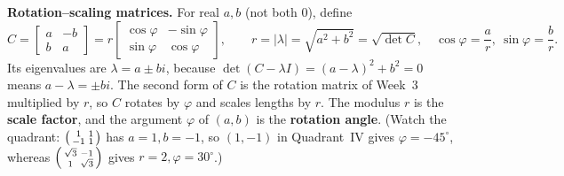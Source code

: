 \documentclass[10pt]{scrartcl}
\begin{document}
\medskip\noindent\textbf{Rotation--scaling matrices.} For real $a,b$ (not both $0$), define
\[
  C = \begin{bmatrix}a&-b\\b&a\end{bmatrix}
  = r\begin{bmatrix}\cos\varphi&-\sin\varphi\\\sin\varphi&\cos\varphi\end{bmatrix},
  \qquad r = |\lambda|=\sqrt{a^2+b^2}=\sqrt{\det C},\quad \cos\varphi=\frac{a}{r},\ \sin\varphi=\frac{b}{r}.
\]
Its eigenvalues are $\lambda=a\pm bi$, because $\det(C-\lambda I)=(a-\lambda)^2+b^2=0$ means $a-\lambda=\pm bi$. The second form of $C$ is the rotation matrix of Week~3 multiplied by $r$, so $C$ rotates by $\varphi$ and scales lengths by $r$. The modulus $r$ is the \textbf{scale factor}, and the argument $\varphi$ of $(a,b)$ is the \textbf{rotation angle}. (Watch the quadrant: $\begin{psmallmatrix}1&1\\-1&1\end{psmallmatrix}$ has $a=1,b=-1$, so $(1,-1)$ in Quadrant~IV gives $\varphi=-45^\circ$, whereas $\begin{psmallmatrix}\sqrt{3}&-1\\1&\sqrt{3}\end{psmallmatrix}$ gives $r=2,\varphi=30^\circ$.)
\end{document}
